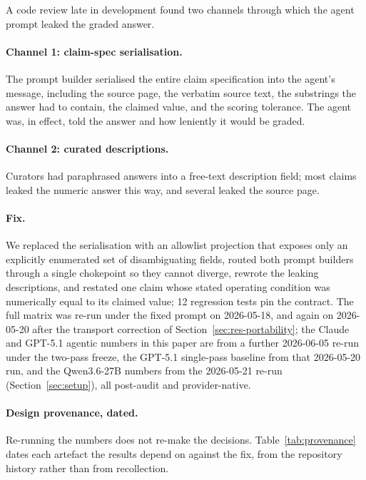 \documentclass[11pt]{article}
\begin{document}
A code review late in development found two channels through which the
agent prompt leaked the graded answer.

\paragraph{Channel 1: claim-spec serialisation.}
The prompt builder serialised the entire claim specification into the
agent's message, including the source page, the verbatim source text,
the substrings the answer had to contain, the claimed value, and the
scoring tolerance. The agent was, in effect, told the answer and how
leniently it would be graded.

\paragraph{Channel 2: curated descriptions.}
Curators had paraphrased answers into a free-text description field;
most claims leaked the numeric answer this way, and several leaked the
source page.

\paragraph{Fix.}
We replaced the serialisation with an allowlist projection that exposes
only an explicitly enumerated set of disambiguating fields, routed both
prompt builders through a single chokepoint so they cannot diverge,
rewrote the leaking descriptions, and restated one claim whose stated
operating condition was numerically equal to its claimed value; 12
regression tests pin the contract. The full matrix was re-run under the
fixed prompt on 2026-05-18, and again on 2026-05-20 after the transport
correction of Section~\ref{sec:res-portability}; the Claude and GPT-5.1
agentic numbers in this paper are from a further 2026-06-05 re-run under
the two-pass freeze, the GPT-5.1 single-pass baseline from that
2026-05-20 run, and the Qwen3.6-27B numbers from the 2026-05-21 re-run
(Section~\ref{sec:setup}), all post-audit and provider-native.

\paragraph{Design provenance, dated.}
Re-running the numbers does not re-make the decisions. Table~\ref{tab:provenance}
dates each artefact the results depend on against the fix, from the
repository history rather than from recollection.
\end{document}

